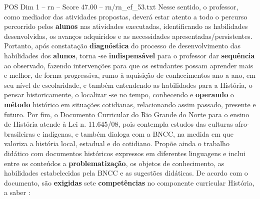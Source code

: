 \begin{textsample}{POS Dim 1 – rn – Score 47.00 – rn/rn\_ef\_53.txt}
Nesse sentido, o professor, como mediador das atividades propostas, deverá estar atento a todo o percurso percorrido pelos \textbf{alunos} nas atividades executadas, identificando as habilidades desenvolvidas, os avanços adquiridos e as necessidades apresentadas/persistentes.
Portanto, após constatação \textbf{diagnóstica} do processo de desenvolvimento das habilidades dos \textbf{alunos}, torna -se \textbf{indispensável} para o professor dar \textbf{sequência} ao observado, fazendo intervenções para que os estudantes possam aprender mais e melhor, de forma progressiva, rumo à aquisição de conhecimentos ano a ano, em seu nível de escolaridade, e também entendendo as habilidades para a História, o pensar historicamente, o localizar -se no tempo, conhecendo e \textbf{operando} o \textbf{método} histórico em situações cotidianas, relacionando assim passado, presente e futuro.
Por fim, o Documento Curricular do Rio Grande do Norte para o ensino de História atende à Lei n. 11.645/08, pois contempla estudos das culturas afro-brasileiras e indígenas, e também dialoga com a BNCC, na medida em que valoriza a história local, estadual e do cotidiano.
Propõe ainda o trabalho didático com documentos históricos expressos em diferentes linguagens e inclui entre os conteúdos a \textbf{problematização}, os objetos de conhecimento, as habilidades estabelecidas pela BNCC e as sugestões didáticas.
De acordo com o documento, são \textbf{exigidas} sete \textbf{competências} no componente curricular História, a saber :

\end{textsample}

